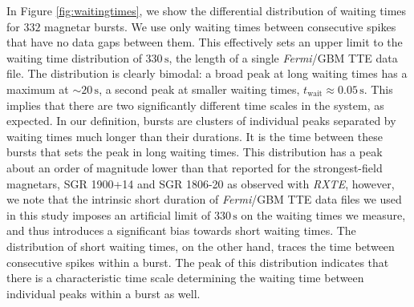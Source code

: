 \documentclass[12pt]{emulateapj}
\newcommand{\project}[1]{\textsl{#1}}
\newcommand{\fermi}{\project{Fermi}}
\newcommand{\rxte}{\project{RXTE}}
\begin{document}
In Figure \ref{fig:waitingtimes}, we show the differential distribution of waiting times for $332$ magnetar bursts. We use only waiting times 
between consecutive spikes that have no data gaps between them. This effectively sets an upper limit to the waiting time distribution of $330\,\mathrm{s}$,
the length of a single \fermi/GBM TTE data file. The distribution is clearly bimodal: a broad peak at long waiting times has a maximum at $\sim 20 \,\mathrm{s}$, a
second peak at smaller waiting times, $t_\mathrm{wait} \approx 0.05 \,\mathrm{s}$. This implies that there are two significantly different time scales
in the system, as expected. In our definition, bursts are clusters of individual peaks separated by
waiting times much longer than their durations. It is the time between these bursts that sets the peak in long waiting times. This distribution has a peak about
an order of magnitude lower than that reported for the strongest-field magnetars, SGR 1900+14 \citep{gogus1999} and SGR 1806-20 \citep{gogus2000} as observed
with \rxte, however, we note that the intrinsic short duration of \fermi/GBM TTE data files we used in this study imposes an artificial limit of $330\,\mathrm{s}$ on the waiting times we measure,
and thus introduces a significant bias towards short waiting times. 
The distribution of short waiting times, on the other hand, traces the time between consecutive spikes within a burst. The peak of this distribution indicates
that there is a characteristic time scale determining the waiting time between individual peaks within a burst as well. 
\end{document}
